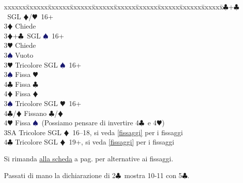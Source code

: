 \documentclass[a4paper,italian]{article}
\newcommand{\BC}{\textcolor{OliveGreen}{$\clubsuit$}}
\newcommand{\BD}{\textcolor{RedOrange}{$\vardiamondsuit$}}
\newcommand{\BH}{\textcolor{Red2}{$\varheartsuit${}}}
\newcommand{\BS}{\textcolor{MidnightBlue}{$\spadesuit${}}}
\newenvironment{bidtable}
{\begin{tabbing}

    xxxxxx\=xxxxxx\=xxxxxx\=xxxxxx\=xxxxxx\=xxxxxx\=xxxxxx\=xxxxxx\=xxxxxx\=xxxxxx\=\kill}
{\end{tabbing} }%
\begin{document}
\begin{bidtable}
    3\BC {}+\BC\ SGL \BD /\BH\ 16+\+\\
    3\BD \> Chiede\-\\
    3\BD {}+\BC\ SGL \BS\ 16+\+\\
    3\BH \> Chiede\+\\
    3\BS \> Vuoto\-\-\\
    3\BH \> Tricolore SGL \BS\ 16+\+\\
    3\BS \> Fissa \BH \\
    4\BC \> Fissa \BC \\
    4\BD \> Fissa \BD \-\\
    3\BS \> Tricolore SGL \BH\ 16+\+\\
    4\BC/\BD \> Fissano \BC /\BD \\
    4\BH \> Fissa \BS\ (Possiamo pensare di invertire 4\BC\ e 4\BH )\-\\
    3SA \> Tricolore SGL \BD\ 16--18, si veda \ref{fissaggi} per i fissaggi\\
    4\BC \> Tricolore SGL \BD\ 19+, si veda \ref{fissaggi} per i fissaggi\\
\end{bidtable}
\bigbreak
Si rimanda \hyperref[fissaggi]{alla scheda} a pag. \pageref{fissaggi} per alternative ai fissaggi.

Passati di mano la dichiarazione di 2\BC\ mostra 10-11 con 5\BC .
\end{document}
